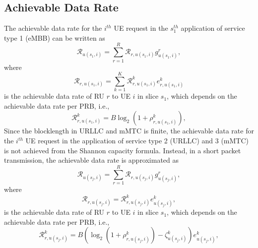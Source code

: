 \documentclass[lettersize,journal]{IEEEtran}
\begin{document}
\subsection{Achievable Data Rate}
\vspace{-1mm}
The achievable data rate for the $i^{th}$ UE request in the $s_{1}^{th}$ application of service type 1 (eMBB) can be written as 
\begin{equation}\label{eq3}
\mathcal{R}_{u(s_1,i)} = \sum_{r=1}^{R}\mathcal{R}_{r,u(s_1,i)} g^r_{u(s_1,i)},
\end{equation}
where
\begin{equation}
\mathcal{R}_{r, u(s_1,i)} = \sum_{k=1}^{K} \mathcal{{R}}_{r,u(s_1,i)}^{k} e^k_{r,u(s_1,i)}
\end{equation}
is the achievable data rate of RU $r$ to UE $i$ in slice $s_1$, which depends on the achievable data rate per PRB, i.e.,
\begin{equation}
\mathcal{{R}}_{r,u(s_1,i)}^{k} =  B \log_2({1+ \rho_{r,u(s_1,i)}^{k}}),
\end{equation}
Since the blocklength in URLLC and mMTC is finite, the achievable data rate for the $i^{th}$ UE request in the application of service type 2 (URLLC) and 3 (mMTC) is not achieved from the Shannon capacity formula. Instead, in a short packet transmission, the achievable data rate is approximated as \cite{setayesh2020joint}
\begin{equation}\label{eq11}
\mathcal{R}_{u(s_j,i)} = \sum_{r=1}^{R}\mathcal{R}_{r,u(s_j,i)} g^r_{u(s_j,i)},
\end{equation}
where
\begin{equation}
\mathcal{R}_{r,u(s_j,i)} = \mathcal{{R}}_{r,u(s_j,i)}^{k}{e}_{u(s_j,i)}^{k},
\end{equation}
is the achievable data rate of RU $r$ to UE $i$ in slice $s_1$, which depends on the achievable data rate per PRB, i.e.,
\begin{equation}
\mathcal{{R}}_{r,u(s_j,i)}^{k} = B (\log_2({1+ \rho_{r,u(s_j,i)}^{k}}) - \zeta_{u(s_j,i)}^{k}){e}_{u(s_j,i)}^{k},
\end{equation}
\end{document}
